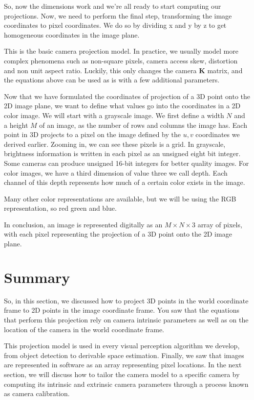 So, now the dimensions
work and we're all ready to start computing
our projections. Now, we need to perform
the final step, transforming the image
coordinates to pixel coordinates. We do so by dividing x and y by z to get homogeneous coordinates
in the image plane. 

This is the basic  camera projection model. In practice, we usually model more complex phenomena
such as non-square pixels, camera access skew, distortion
and non unit aspect ratio. Luckily, this only changes
the camera $\mathbf{K}$ matrix, and the equations above can be used as is with a few
additional parameters. 

Now that we have formulated
the coordinates of projection of a 3D point onto
the 2D image plane, we want to define
what values go into the coordinates in
a 2D color image. We will start with
a grayscale image. We first define a width $N$
and a height $M$ of an image, as the number of rows and
columns the image has. Each point in 3D projects
to a pixel on the image defined by the $u, v$ coordinates
we derived earlier. Zooming in, we can see
these pixels is a grid. In grayscale, brightness
information is written in each pixel as
an unsigned eight bit integer. Some cameras can produce unsigned 16-bit integers
for better quality images. For color images, we have a third dimension of value
three we call depth. Each channel of
this depth represents how much of a certain color
exists in the image. 


Many other color
representations are available, but we will be using
the RGB representation, so red green and blue. 

In conclusion, an image is represented digitally as an $M \times N \times 3$ array of pixels, with each pixel
representing the projection of a 3D point onto
the 2D image plane. 

\section{Summary}

So, in this section, we discussed how to project 3D points in the world coordinate frame to 2D points in
the image coordinate frame. You saw that the equations that perform this projection rely on camera intrinsic
parameters as well as on the location of the camera in the world coordinate frame.  

This projection model is used in every visual perception algorithm we develop, from object detection to
derivable space estimation. Finally, we saw that images are represented in software as an array
representing pixel locations.  In the next section, we will discuss how to
tailor the camera model to a specific camera by computing its intrinsic and extrinsic
camera parameters through a process known as camera calibration.